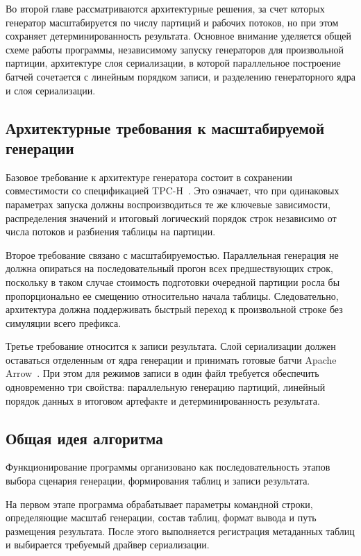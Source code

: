 Во второй главе рассматриваются архитектурные решения, за счет которых
генератор масштабируется по числу партиций и рабочих потоков, но при этом
сохраняет детерминированность результата. Основное внимание уделяется общей
схеме работы программы, независимому запуску генераторов для произвольной
партиции, архитектуре слоя сериализации, в которой параллельное построение
батчей сочетается с линейным порядком записи, и разделению генераторного ядра
и слоя сериализации.

\subsection{Архитектурные требования к масштабируемой генерации}

Базовое требование к архитектуре генератора состоит в сохранении совместимости
со спецификацией TPC-H~\cite{tpch-spec}. Это означает, что при
одинаковых параметрах запуска должны воспроизводиться те же ключевые
зависимости, распределения значений и итоговый логический порядок строк
независимо от числа потоков и разбиения таблицы на партиции.

Второе требование связано с масштабируемостью. Параллельная генерация не должна
опираться на последовательный прогон всех предшествующих строк, поскольку в
таком случае стоимость подготовки очередной партиции росла бы пропорционально
ее смещению относительно начала таблицы. Следовательно, архитектура должна
поддерживать быстрый переход к произвольной строке без симуляции всего
префикса.

Третье требование относится к записи результата. Слой сериализации должен
оставаться отделенным от ядра генерации и принимать готовые батчи
Apache Arrow~\cite{apache-arrow}. При этом для режимов записи в один
файл требуется обеспечить одновременно три свойства: параллельную генерацию
партиций, линейный порядок данных в итоговом артефакте и детерминированность
результата.

\subsection{Общая идея алгоритма}

Функционирование программы организовано как последовательность этапов выбора
сценария генерации, формирования таблиц и записи результата.

На первом этапе программа обрабатывает параметры командной строки, определяющие
масштаб генерации, состав таблиц, формат вывода и путь размещения результата.
После этого выполняется регистрация метаданных таблиц и выбирается требуемый
драйвер сериализации.

